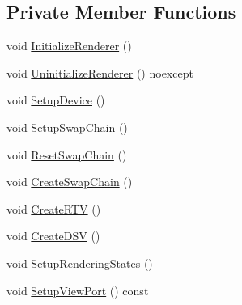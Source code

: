 \subsection*{Private Member Functions}
\begin{DoxyCompactItemize}
\item 
void \hyperlink{classmage_1_1_renderer_a2bb7f4e41ef6db047ce3023ed4e5d0c1}{Initialize\+Renderer} ()
\item 
void \hyperlink{classmage_1_1_renderer_a28c76b49e51e49e58fdeb0b72b12f3b6}{Uninitialize\+Renderer} () noexcept
\item 
void \hyperlink{classmage_1_1_renderer_aedf5e2e3f73d3d05c09c5fc9f8ac06c3}{Setup\+Device} ()
\item 
void \hyperlink{classmage_1_1_renderer_a8d3030611390f69120f1e5b91225eddf}{Setup\+Swap\+Chain} ()
\item 
void \hyperlink{classmage_1_1_renderer_a1c4615559503b339a9cdc6ac17e1e858}{Reset\+Swap\+Chain} ()
\item 
void \hyperlink{classmage_1_1_renderer_a1bd77bf54ea3a7867691785efd183013}{Create\+Swap\+Chain} ()
\item 
void \hyperlink{classmage_1_1_renderer_a140f8bfcf5c30343791f0187f5caef14}{Create\+R\+TV} ()
\item 
void \hyperlink{classmage_1_1_renderer_a0616cdfae1dda026b29785b422e220a3}{Create\+D\+SV} ()
\item 
void \hyperlink{classmage_1_1_renderer_ae69efac8c058f25f1c5d409c4ec7ff6e}{Setup\+Rendering\+States} ()
\item 
void \hyperlink{classmage_1_1_renderer_ab60757e174f0f82089361a0d46a1eacc}{Setup\+View\+Port} () const
\end{DoxyCompactItemize}
